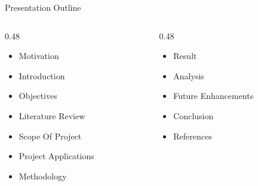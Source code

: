\begin{frame}{Presentation Outline}
    \begin{columns}[t, onlytextwidth]
        \begin{column}{0.48\textwidth}
            \begin{itemize}
                \item Motivation
                \item Introduction
                \item Objectives
                \item Literature Review
                \item Scope Of Project
                \item Project Applications
                \item Methodology
            \end{itemize}
        \end{column}
        \begin{column}{0.48\textwidth}
            \begin{itemize}
                \item Result
                \item Analysis
                \item Future Enhancements
                \item Conclusion
                \item References
            \end{itemize}
        \end{column}
    \end{columns}
\end{frame}
